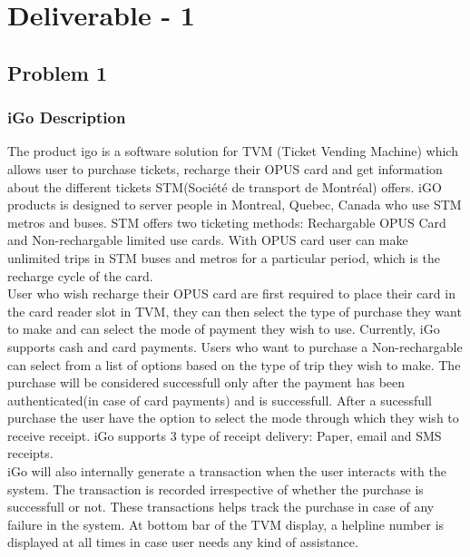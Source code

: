 \documentclass[a4paper,12pt]{report}
\begin{document}

\newpage

\tableofcontents




\chapter*{\centering Deliverable - 1}

\section{Problem 1}

\subsection{iGo Description}
The product \gls{igo} is a software solution for TVM (Ticket Vending Machine) which allows user to purchase tickets, recharge their OPUS card and get information about the different tickets STM(Société de transport de Montréal) offers. iGO products is designed to server people in Montreal, Quebec, Canada who use STM metros and buses. STM offers two ticketing methods: Rechargable OPUS Card and Non-rechargable limited use cards. With OPUS card user can make unlimited trips in STM buses and metros for a particular period, which is the recharge cycle of the card. \\


User who wish recharge their OPUS card are first required to place their card in the card reader slot in TVM, they can then select the type of purchase they want to make and can select the mode of payment they wish to use. Currently, iGo supports cash and card payments. Users who want to purchase a Non-rechargable can select from a list of options based on the type of trip they wish to make. The purchase will be considered successfull only after the payment has been authenticated(in case of card payments) and is successfull. After a sucessfull purchase the user have the option to select the mode through which they wish to receive receipt. iGo supports 3 type of receipt delivery: Paper, email and SMS receipts. \\

iGo will also internally generate a transaction when the user interacts with the system. The transaction is recorded irrespective of whether the purchase is successfull or not. These transactions helps track the purchase in case of any failure in the system. At bottom bar of the TVM display, a helpline number is displayed at all times in case user needs any kind of assistance.
\end{document}
